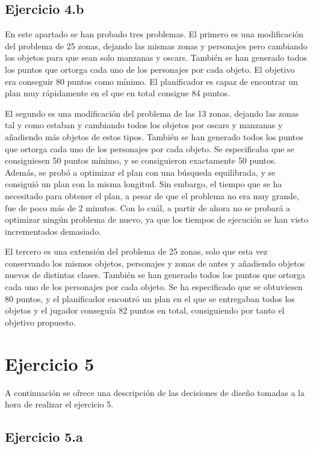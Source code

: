 \documentclass[11pt,a4paper]{article}
\begin{document}
\subsection{Ejercicio 4.b}

En este apartado se han probado tres problemas. El primero es una modificación del problema de 25 zonas, dejando las mismas zonas
y personajes pero cambiando los objetos para que sean solo manzanas y oscars.
También se han generado todos los puntos que ortorga cada uno de los personajes por cada objeto.
El objetivo era conseguir 80 puntos como mínimo. 
El planificador es capaz de encontrar un plan muy rápidamente en el que en total consigue 84 puntos.

El segundo es una modificación del problema de las 13 zonas, dejando las zonas tal y como estaban y cambiando todos los objetos por
oscars y manzanas y añadiendo más objetos de estos tipos.
También se han generado todos los puntos que ortorga cada uno de los personajes por cada objeto.
Se especificaba que se consiguiesen 50 puntos mínimo, y se consiguieron
exactamente 50 puntos. Además, se probó a optimizar el plan con una búsqueda equilibrada, y se consiguió un plan con la misma
longitud. Sin embargo, el tiempo que se ha necesitado para obtener el plan, a pesar de que el problema no era muy grande, fue de poco
más de 2 minutos. Con lo cuál, a partir de ahora no se probará a optimizar ningún problema de nuevo, ya que los tiempos de ejecución
se han visto incrementados demasiado.

El tercero es una extensión del problema de 25 zonas, solo que esta vez conservando los mismos objetos, personajes y zonas de antes
y añadiendo objetos nuevos de distintas clases.
También se han generado todos los puntos que ortorga cada uno de los personajes por cada objeto.
Se ha especificado que se obtuviesen 80 puntos, y el planificador encontró un plan
en el que se entregaban todos los objetos y el jugador conseguía 82 puntos en total, consiguiendo por tanto el objetivo propuesto.

\section{Ejercicio 5}

A continuación se ofrece una descripción de las decisiones de diseño tomadas a la hora de realizar el ejercicio 5.

\subsection{Ejercicio 5.a}
\end{document}
